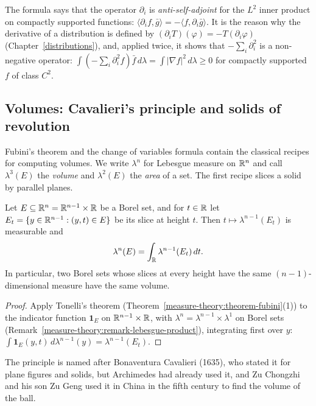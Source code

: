 The formula says that the operator $\partial_i$ is \emph{anti-self-adjoint} for the $L^2$ inner product on compactly supported functions: $\langle\partial_if, \bar g\rangle = -\langle f, \partial_i\bar g\rangle$. It is the
reason why the derivative of a distribution is defined by $(\partial_iT)(\varphi) = -T(\partial_i\varphi)$ (Chapter~\ref{distributions}), and, applied twice, it shows that $-\sum_i\partial_i^2$ is a
non-negative operator: $\int(-\sum_i\partial_i^2f)\bar f\,d\lambda = \int|\nabla f|^2\,d\lambda \geq 0$ for compactly supported $f$ of class $C^2$.

\subsection{Volumes: Cavalieri's principle and solids of revolution}\label{measure-theory:subsection-volumes}

Fubini's theorem and the change of variables formula contain the classical recipes for computing volumes. We write $\lambda^n$ for Lebesgue measure on $\mathbb{R}^n$ and call $\lambda^3(E)$ the \emph{volume}
and $\lambda^2(E)$ the \emph{area} of a set. The first recipe slices a solid by parallel planes.

\begin{proposition}\label{measure-theory:proposition-cavalieri}
Let $E \subseteq \mathbb{R}^n = \mathbb{R}^{n-1} \times \mathbb{R}$ be a Borel set, and for $t \in \mathbb{R}$ let $E_t = \{y \in \mathbb{R}^{n-1} : (y, t) \in E\}$ be its slice at height $t$. Then $t \mapsto \lambda^{n-1}(E_t)$ is measurable and
\[
\lambda^n(E) = \int_{\mathbb{R}}\lambda^{n-1}(E_t)\,dt .
\]
In particular, two Borel sets whose slices at every height have the same $(n-1)$-dimensional measure have the same volume.
\end{proposition}

\begin{proof}
Apply Tonelli's theorem (Theorem~\ref{measure-theory:theorem-fubini}(1)) to the indicator function $\mathbf{1}_E$ on $\mathbb{R}^{n-1} \times \mathbb{R}$, with $\lambda^n = \lambda^{n-1} \times \lambda^1$ on Borel sets
(Remark~\ref{measure-theory:remark-lebesgue-product}), integrating first over $y$: $\int\mathbf{1}_E(y, t)\,d\lambda^{n-1}(y) = \lambda^{n-1}(E_t)$.
\end{proof}

The principle is named after Bonaventura Cavalieri (1635), who stated it for plane figures and solids, but Archimedes had already used it, and Zu Chongzhi and his son Zu Geng used it in China in the
fifth century to find the volume of the ball.

